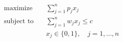 \begin{align*}
\text{maximize} \quad & \sum_{j=1}^n p_j x_j \\
\text{subject to} \quad & \sum_{j=1}^n w_j x_j \leq c \\
& x_j \in \lbrace 0, 1 \rbrace, \quad j = 1, \ldots,n
\end{align*}


